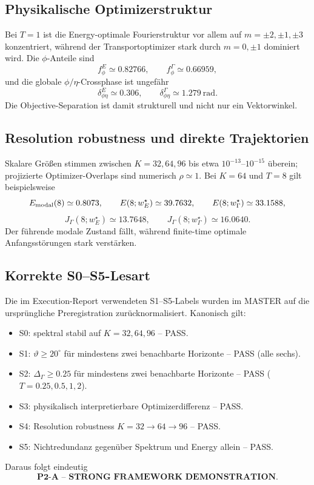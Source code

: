 \subsection{Physikalische Optimizerstruktur}
Bei $T=1$ ist die Energy-optimale Fourierstruktur vor allem auf $m=\pm2,\pm1,\pm3$ konzentriert, während der Transportoptimizer stark durch $m=0,\pm1$ dominiert wird. Die $\phi$-Anteile sind
\[
f_\phi^E\simeq0.82766,
\qquad
f_\phi^\Gamma\simeq0.66959,
\]
und die globale $\phi/\eta$-Crossphase ist ungefähr
\[
\delta_{\phi\eta}^E\simeq0.306,
\qquad
\delta_{\phi\eta}^\Gamma\simeq1.279\ \text{rad}.
\]
Die Objective-Separation ist damit strukturell und nicht nur ein Vektorwinkel.

\subsection{Resolution robustness und direkte Trajektorien}
Skalare Größen stimmen zwischen $K=32,64,96$ bis etwa $10^{-13}$--$10^{-15}$ überein; projizierte Optimizer-Overlaps sind numerisch $\rho\simeq1$. Bei $K=64$ und $T=8$ gilt beispielsweise
\[
E_{\rm modal}(8)\simeq0.8073,
\qquad
E(8;w_E^\star)\simeq39.7632,
\qquad
E(8;w_\Gamma^\star)\simeq33.1588,
\]
\[
J_\Gamma(8;w_E^\star)\simeq13.7648,
\qquad
J_\Gamma(8;w_\Gamma^\star)\simeq16.0640.
\]
Der führende modale Zustand fällt, während finite-time optimale Anfangsstörungen stark verstärken.

\subsection{Korrekte S0--S5-Lesart}
Die im Execution-Report verwendeten S1--S5-Labels wurden im MASTER auf die ursprüngliche Preregistration zurücknormalisiert. Kanonisch gilt:
\begin{itemize}
\item S0: spektral stabil auf $K=32,64,96$ -- PASS.
\item S1: $\vartheta\ge20^\circ$ für mindestens zwei benachbarte Horizonte -- PASS (alle sechs).
\item S2: $\Delta_\Gamma\ge0.25$ für mindestens zwei benachbarte Horizonte -- PASS ($T=0.25,0.5,1,2$).
\item S3: physikalisch interpretierbare Optimizerdifferenz -- PASS.
\item S4: Resolution robustness $K=32\to64\to96$ -- PASS.
\item S5: Nichtredundanz gegenüber Spektrum und Energy allein -- PASS.
\end{itemize}
Daraus folgt eindeutig
\[
\boxed{\textbf{P2-A -- STRONG FRAMEWORK DEMONSTRATION}.}
\]

